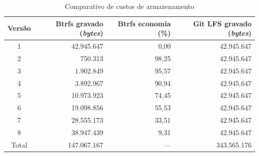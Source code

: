 \begin{table}[htb]
  \centering
  \caption{\label{tab:resultados-exp2}Comparativo de custos de armazenamento}
  \begin{tabular}{crrr}
    \toprule
    \textbf{Versão} & \textbf{Btrfs gravado (\textit{bytes})} &
    \textbf{Btrfs economia (\%)} & \textbf{Git LFS gravado (\textit{bytes})} \\
    \midrule
    1 & 42.945.647  & 0,00  & 42.945.647 \\
    2 & 750.313     & 98,25 & 42.945.647 \\
    3 & 1.902.849   & 95,57 & 42.945.647 \\
    4 & 3.892.967   & 90,94 & 42.945.647 \\
    5 & 10.973.923  & 74,45 & 42.945.647 \\
    6 & 19.098.856  & 55,53 & 42.945.647 \\
    7 & 28.555.173  & 33,51 & 42.945.647 \\
    8 & 38.947.439  & 9,31  & 42.945.647 \\
    \midrule
    Total & 147.067.167 & --- & 343.565.176 \\
    \bottomrule
  \end{tabular}
\end{table}